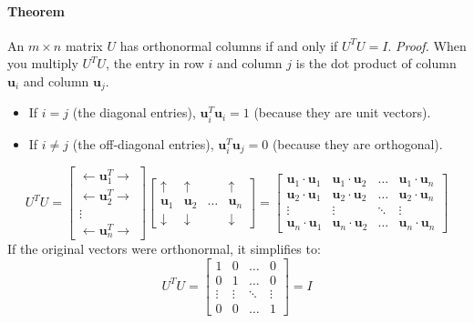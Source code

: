 \documentclass[../linear-algebra.tex]{subfiles}
\begin{document}
\paragraph{Theorem} An $m \times n$ matrix $U$ has orthonormal columns if and only if $U^T U = I$.\newline
\textit{Proof.} When you multiply $U^T U$, the entry in row $i$ and column $j$ is the dot product of column $\mathbf{u}_i$ and column $\mathbf{u}_j$.
\begin{itemize}
    \item If $i = j$ (the diagonal entries), $\mathbf{u}_i^T \mathbf{u}_i = 1$ (because they are unit vectors).
    \item If $i \neq j$ (the off-diagonal entries), $\mathbf{u}_i^T \mathbf{u}_j = 0$ (because they are orthogonal).
\end{itemize}
$$U^T U = \begin{bmatrix} \leftarrow \mathbf{u}_1^T \rightarrow \\ \leftarrow \mathbf{u}_2^T \rightarrow \\ \vdots \\ \leftarrow \mathbf{u}_n^T \rightarrow \end{bmatrix} \begin{bmatrix} \uparrow & \uparrow & & \uparrow \\ \mathbf{u}_1 & \mathbf{u}_2 & \dots & \mathbf{u}_n \\ \downarrow & \downarrow & & \downarrow \end{bmatrix} = \begin{bmatrix} \mathbf{u}_1 \cdot \mathbf{u}_1 & \mathbf{u}_1 \cdot \mathbf{u}_2 & \dots & \mathbf{u}_1 \cdot \mathbf{u}_n \\ \mathbf{u}_2 \cdot \mathbf{u}_1 & \mathbf{u}_2 \cdot \mathbf{u}_2 & \dots & \mathbf{u}_2 \cdot \mathbf{u}_n \\ \vdots & \vdots & \ddots & \vdots \\ \mathbf{u}_n \cdot \mathbf{u}_1 & \mathbf{u}_n \cdot \mathbf{u}_2 & \dots & \mathbf{u}_n \cdot \mathbf{u}_n \end{bmatrix}$$
If the original vectors were orthonormal, it simplifies to:
$$U^T U = \begin{bmatrix} 1 & 0 & \dots & 0 \\ 0 & 1 & \dots & 0 \\ \vdots & \vdots & \ddots & \vdots \\ 0 & 0 & \dots & 1 \end{bmatrix} = I$$
\end{document}
